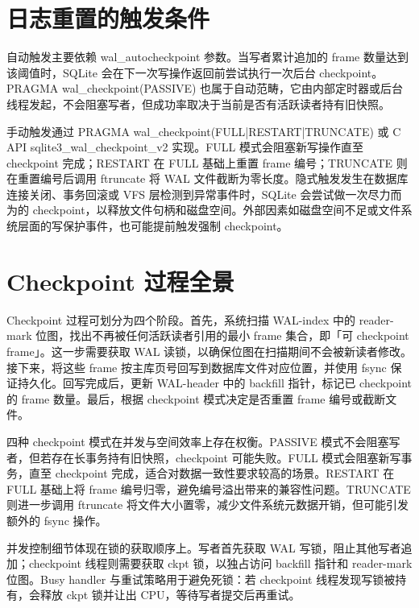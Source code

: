 \chapter{日志重置的触发条件}
自动触发主要依赖 wal\_{}autocheckpoint 参数。当写者累计追加的 frame 数量达到该阈值时，SQLite 会在下一次写操作返回前尝试执行一次后台 checkpoint。PRAGMA wal\_{}checkpoint(PASSIVE) 也属于自动范畴，它由内部定时器或后台线程发起，不会阻塞写者，但成功率取决于当前是否有活跃读者持有旧快照。\par
手动触发通过 PRAGMA wal\_{}checkpoint(FULL|RESTART|TRUNCATE) 或 C API sqlite3\_{}wal\_{}checkpoint\_{}v2 实现。FULL 模式会阻塞新写操作直至 checkpoint 完成；RESTART 在 FULL 基础上重置 frame 编号；TRUNCATE 则在重置编号后调用 ftruncate 将 WAL 文件截断为零长度。隐式触发发生在数据库连接关闭、事务回滚或 VFS 层检测到异常事件时，SQLite 会尝试做一次尽力而为的 checkpoint，以释放文件句柄和磁盘空间。外部因素如磁盘空间不足或文件系统层面的写保护事件，也可能提前触发强制 checkpoint。\par
\chapter{Checkpoint 过程全景}
Checkpoint 过程可划分为四个阶段。首先，系统扫描 WAL-index 中的 reader-mark 位图，找出不再被任何活跃读者引用的最小 frame 集合，即「可 checkpoint frame」。这一步需要获取 WAL 读锁，以确保位图在扫描期间不会被新读者修改。接下来，将这些 frame 按主库页号回写到数据库文件对应位置，并使用 fsync 保证持久化。回写完成后，更新 WAL-header 中的 backfill 指针，标记已 checkpoint 的 frame 数量。最后，根据 checkpoint 模式决定是否重置 frame 编号或截断文件。\par
四种 checkpoint 模式在并发与空间效率上存在权衡。PASSIVE 模式不会阻塞写者，但若存在长事务持有旧快照，checkpoint 可能失败。FULL 模式会阻塞新写事务，直至 checkpoint 完成，适合对数据一致性要求较高的场景。RESTART 在 FULL 基础上将 frame 编号归零，避免编号溢出带来的兼容性问题。TRUNCATE 则进一步调用 ftruncate 将文件大小置零，减少文件系统元数据开销，但可能引发额外的 fsync 操作。\par
并发控制细节体现在锁的获取顺序上。写者首先获取 WAL 写锁，阻止其他写者追加；checkpoint 线程则需要获取 ckpt 锁，以独占访问 backfill 指针和 reader-mark 位图。Busy handler 与重试策略用于避免死锁：若 checkpoint 线程发现写锁被持有，会释放 ckpt 锁并让出 CPU，等待写者提交后再重试。\par

